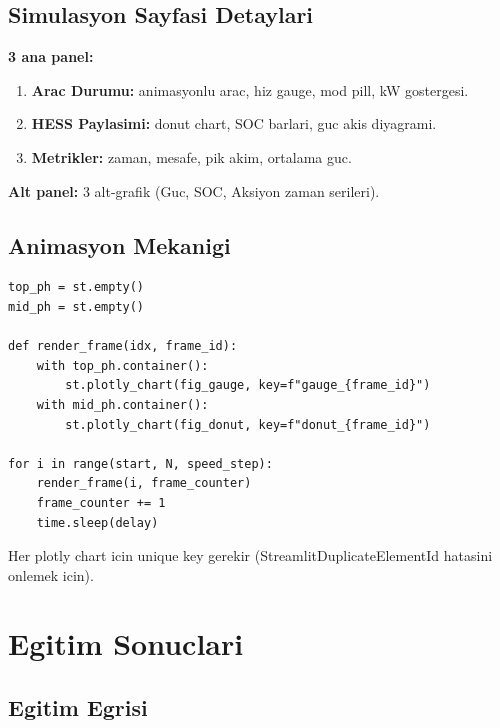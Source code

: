\documentclass[11pt,a4paper]{article}
\begin{document}
\subsection{Simulasyon Sayfasi Detaylari}

\textbf{3 ana panel:}
\begin{enumerate}
  \item \textbf{Arac Durumu:} animasyonlu arac, hiz gauge, mod pill, kW gostergesi.
  \item \textbf{HESS Paylasimi:} donut chart, SOC barlari, guc akis diyagrami.
  \item \textbf{Metrikler:} zaman, mesafe, pik akim, ortalama guc.
\end{enumerate}

\textbf{Alt panel:} 3 alt-grafik (Guc, SOC, Aksiyon zaman serileri).

\subsection{Animasyon Mekanigi}

\begin{lstlisting}[style=py]
top_ph = st.empty()
mid_ph = st.empty()

def render_frame(idx, frame_id):
    with top_ph.container():
        st.plotly_chart(fig_gauge, key=f"gauge_{frame_id}")
    with mid_ph.container():
        st.plotly_chart(fig_donut, key=f"donut_{frame_id}")

for i in range(start, N, speed_step):
    render_frame(i, frame_counter)
    frame_counter += 1
    time.sleep(delay)
\end{lstlisting}

Her plotly chart icin unique key gerekir (StreamlitDuplicateElementId hatasini onlemek icin).

\section{Egitim Sonuclari}

\subsection{Egitim Egrisi}

\begin{center}
\end{center}
\end{document}
